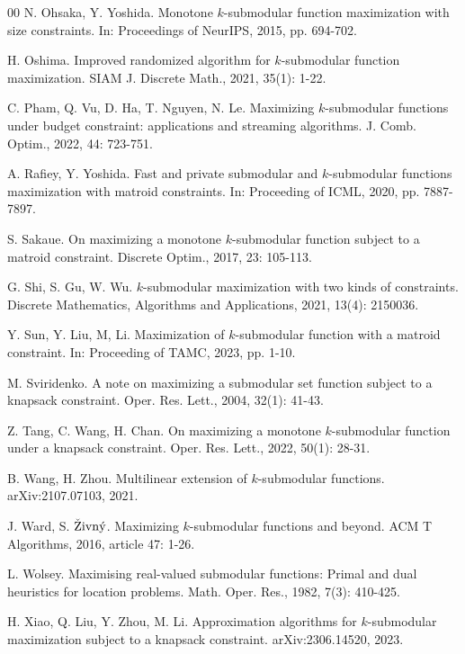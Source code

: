 \documentclass[preprint,12pt]{elsarticle}
\begin{document}
\begin{thebibliography}{00}
N. Ohsaka, Y. Yoshida.
Monotone $k$-submodular function maximization with size constraints.
In: Proceedings of NeurIPS, 2015, pp. 694-702.

H. Oshima.
Improved randomized algorithm for $k$-submodular function maximization.
SIAM J. Discrete Math., 2021, 35(1): 1-22.

C. Pham, Q. Vu, D. Ha, T. Nguyen, N. Le.
Maximizing $k$-submodular functions under budget constraint: applications and streaming algorithms.
J. Comb. Optim., 2022, 44: 723-751.

A. Rafiey, Y. Yoshida.
Fast and private submodular and $k$-submodular functions maximization with matroid constraints.
In: Proceeding of ICML, 2020, pp. 7887-7897.

S. Sakaue.
On maximizing a monotone $k$-submodular function subject to a matroid constraint.
Discrete Optim., 2017, 23: 105-113.

G. Shi, S. Gu, W. Wu.
$k$-submodular maximization with two kinds of constraints.
Discrete Mathematics, Algorithms and Applications, 2021, 13(4): 2150036.

Y. Sun, Y. Liu, M, Li.
Maximization of $k$-submodular function with a matroid constraint.
In: Proceeding of TAMC, 2023, pp. 1-10.

M. Sviridenko.
A note on maximizing a submodular set function subject to a knapsack constraint.
Oper. Res. Lett., 2004, 32(1): 41-43.


Z. Tang, C. Wang, H. Chan.
On maximizing a monotone $k$-submodular function under a knapsack constraint.
Oper. Res. Lett., 2022, 50(1): 28-31.
%


B. Wang, H. Zhou.
Multilinear extension of $k$-submodular functions.
arXiv:2107.07103, 2021.


J. Ward, S. ${\rm\check{Z}ivn\acute{y}}$.
Maximizing $k$-submodular functions and beyond.
ACM T Algorithms, 2016, article 47: 1-26.

L. Wolsey.
Maximising real-valued submodular functions: Primal and dual heuristics for location problems.
Math. Oper. Res., 1982, 7(3): 410-425.

H. Xiao, Q. Liu, Y. Zhou, M. Li.
Approximation algorithms for $k$-submodular
maximization subject to a knapsack constraint.
arXiv:2306.14520, 2023.


\end{thebibliography}
\end{document}
